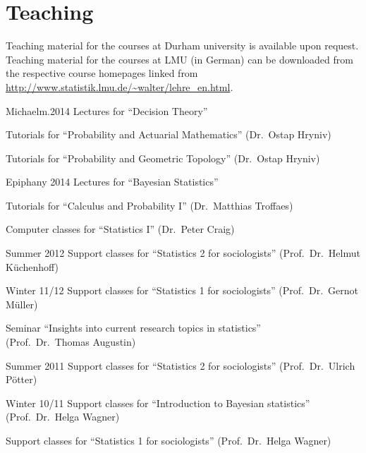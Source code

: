 \documentclass[a4paper]{simplecv}
\begin{document}
\newpage
\vspace*{-8ex}
\section{Teaching}
\label{teaching}
\vspace*{-1.5ex}
Teaching material for the courses at Durham university is available upon request.
Teaching material for the courses at LMU (in German) can be downloaded from the respective course homepages
linked from \url{http://www.statistik.lmu.de/~walter/lehre_en.html}.
\vspace*{-0.5ex}
\begin{topic}
\item[Michaelm.2014] Lectures for ``Decision Theory''

                    Tutorials for ``Probability and Actuarial Mathematics'' (Dr.\ Ostap Hryniv)

                    Tutorials for ``Probability and Geometric Topology'' (Dr.\ Ostap Hryniv)

\item[Epiphany 2014] Lectures for ``Bayesian Statistics''

                    Tutorials for ``Calculus and Probability I'' (Dr.\ Matthias Troffaes)

                    Computer classes for ``Statistics I'' (Dr.\ Peter Craig) 

\item[Summer 2012]  Support classes for ``Statistics 2 for sociologists'' (Prof.\ Dr.\ Helmut K\"{u}chenhoff)

\item[Winter 11/12] Support classes for ``Statistics 1 for sociologists'' (Prof.\ Dr.\ Gernot M\"{u}ller)

                    Seminar ``Insights into current research topics in statistics''\\ (Prof.\ Dr.\ Thomas Augustin)
                    
\item[Summer 2011]  Support classes for ``Statistics 2 for sociologists'' (Prof.\ Dr.\ Ulrich P\"{o}tter)

\item[Winter 10/11] Support classes for ``Introduction to Bayesian statistics''\\ (Prof.\ Dr.\ Helga Wagner)

                    Support classes for ``Statistics 1 for sociologists'' (Prof.\ Dr.\ Helga Wagner)


\end{topic}
\end{document}
